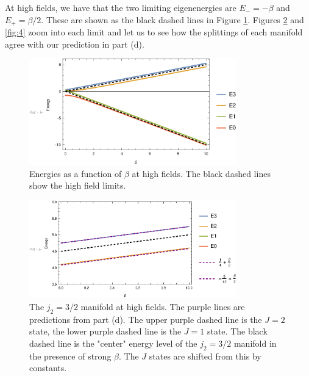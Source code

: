 \documentclass{article}
\theoremstyle{definition}
\newcommand{\be}{\beta}
\begin{document}
\begin{enumerate}[label=(\alph*)]
	At high fields, we have that the two limiting eigenenergies are $E_- = -\be$ and $E_+ = \be/2$. These are shown as the black dashed lines in Figure \ref{fig:2}.  Figures \ref{fig:3} and \ref{fig:4} zoom into each limit and let us to see how the splittings of each manifold agree with our prediction in part (d). 


	\begin{figure}[!htb]
		\centering
		\includegraphics[width=0.8\textwidth]{B_high.eps}
		\caption{Energies as a function of $\be$ at high fields. The black dashed lines show the high field limits. }
		\label{fig:2}
	\end{figure}

	
		
	\begin{figure}[!htb]
		\centering
		\includegraphics[width=0.8\textwidth]{B_high_zoom_1.eps}
		\caption{The $j_2=3/2$ manifold at high fields. The purple lines are predictions from part (d). The upper purple dashed line is the $J=2$ state, the lower purple dashed line is the $J=1$ state. The black dashed line is the "center" energy level of the $j_2=3/2$ manifold in the presence of strong $\be$. The $J$ states are shifted from this by constants.} 
		\label{fig:3}
	\end{figure}
	

\end{enumerate}
\end{document}
